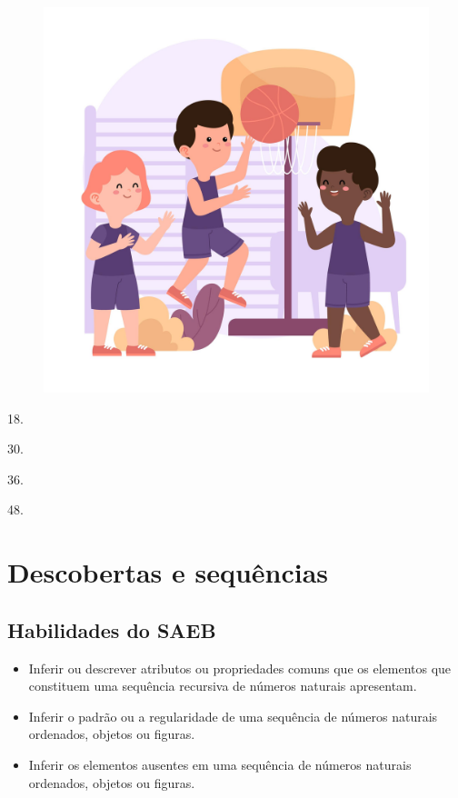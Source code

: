 \begin{figure}[htpb!]
\centering
\includegraphics[width=.6\textwidth]{./media/image16e.jpeg}
\end{figure}

\begin{multicols}{2}
\begin{escolha}
\item
  18.
\item
  30.
\item
  36.
\item
  48.
\end{escolha}
\end{multicols}
\chapter{Descobertas e sequências}
\enlargethispage{\baselineskip}

\section*{Habilidades do SAEB}

\begin{itemize}
\item Inferir ou descrever atributos ou propriedades comuns que os elementos
que constituem uma sequência recursiva de números naturais apresentam.

\item Inferir o padrão ou a regularidade de uma sequência de números
naturais ordenados, objetos ou figuras.

\item Inferir os elementos ausentes em uma sequência de números naturais
ordenados, objetos ou figuras.
\end{itemize}

